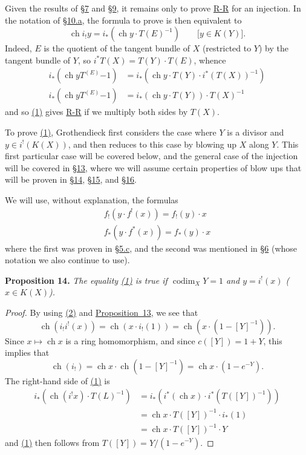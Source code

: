 \documentclass{article}
\newenvironment{itenv}[1]
  {\phantomsection\par\medskip\noindent\textbf{#1.}\itshape}
  {\par\medskip}
\DeclareMathOperator{\ch}{ch}
\DeclareMathOperator{\codim}{codim}
\newcommand{\oldpage}[1]{\marginpar{\footnotesize$\Big\vert$ \textit{p.~#1}}}
\begin{document}
Given the results of \hyperref[section7]{\S7} and \hyperref[section9]{\S9}, it remains only to prove \hyperref[theoremriemannroch]{R-R} for an injection.
In the notation of \hyperref[subsection10a]{\S10.a}, the formula to prove is then equivalent to
\[
\label{section11equation1}
  \ch i_!y = i_*(\ch y\cdot T(E)^{-1})
  \qquad\mbox{[$y\in K(Y)$].}
  \tag{1}
\]
Indeed, $E$ is the quotient of the tangent bundle of $X$ (restricted to $Y$) by the tangent bundle of $Y$, so $i^*T(X) = T(Y)\cdot T(E)$, whence
\begin{align*}
  i_*(\ch y T^(E){-1}) &= i_*(\ch y\cdot T(Y)\cdot i^*(T(X))^{-1})
\\i_*(\ch y T^(E){-1}) &= i_*(\ch y\cdot T(Y))\cdot T(X)^{-1}
\end{align*}
and so \hyperref[section11equation1]{(1)} gives \hyperref[theoremriemannroch]{R-R} if we multiply both sides by $T(X)$.

To prove \hyperref[section11equation1]{(1)}, Grothendieck first considers the case where $Y$ is a divisor and $y\in i^!(K(X))$, and then reduces to this case by blowing up $X$ along $Y$.
This first particular case will be covered below, and the general case of the injection will be covered in \hyperref[section13]{\S13}, where we will assume certain properties of blow ups that will be proven in \hyperref[section14]{\S14}, \hyperref[section15]{\S15}, and \hyperref[section16]{\S16}.

We will use, without explanation, the formulas
\[
\label{section11equation2}
  \begin{aligned}
    f_!(y\cdot f^!(x)) = f_!(y)\cdot x
  \\f_*(y\cdot f^*(x)) = f_*(y)\cdot x
  \end{aligned}
  \tag{2}
\]
where the first was proven in \hyperref[subsection5c]{\S5.c}, and the second was mentioned in \hyperref[section6]{\S6} (whose notation we also continue to use).

\begin{itenv}{Proposition 14}
\label{proposition14}
  The equality \hyperref[section11equation1]{(1)} is true if $\codim_XY=1$ and $y=i^!(x)$ ($x\in K(X)$).
\end{itenv}

\begin{proof}
  By using \hyperref[section11equation2]{(2)} and \hyperref[proposition13]{Proposition~13}, we see that
  \[
    \ch(i_!i^!(x)) = \ch(x\cdot i_!(1)) = \ch(x\cdot(1-[Y]^{-1})).
  \]
  Since $x\mapsto\ch x$ is a ring homomorphism, and since $c([Y])=1+Y$,
\oldpage{125}
  this implies that
  \[
    \ch(i_!) = \ch x\cdot\ch(1-[Y]^{-1}) = \ch x\cdot(1-e^{-Y}).
  \]
  The right-hand side of \hyperref[section11equation1]{(1)} is
  \begin{align*}
    i_*(\ch(i^!x)\cdot T(L)^{-1})
    &= i_*(i^*(\ch x)\cdot i^*(T([Y])^{-1}))
  \\&= \ch x\cdot T([Y])^{-1}\cdot i_*(1)
  \\&= \ch x\cdot T([Y])^{-1}\cdot Y
  \end{align*}
  and \hyperref[section11equation1]{(1)} then follows from $T([Y])=Y/(1-e^{-Y})$.
\end{proof}
\end{document}
